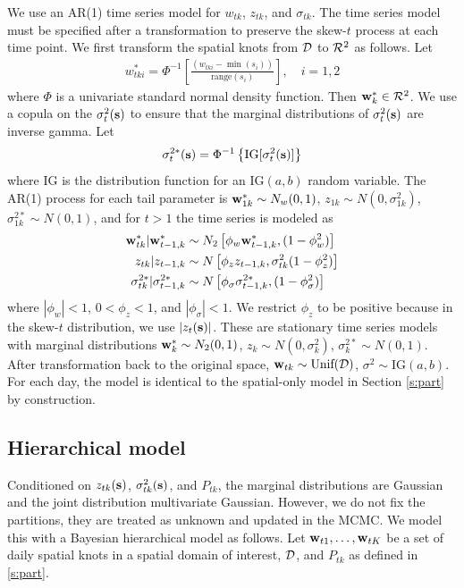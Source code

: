 \documentclass[11pt]{article}
\begin{document}
We use an AR(1) time series model for $w_{tk}$, $z_{tk}$, and $\sigma_{tk}$.
The time series model must be specified after a transformation to preserve the skew-$t$ process at each time point.
We first transform the spatial knots from ${\cal D}$ to ${\cal R}^2$ as follows.
Let
\begin{align}
  w^*_{tki} = \Phi^{-1}\left[ \frac{ (w_{tki} - \min(s_i))}{ \text{range}(s_i) } \right], \quad i = 1, 2
\end{align}
where $\Phi$ is a univariate standard normal density function.
Then $\mbox{\bf w}^*_k \in {\cal R}^2$.
We use a copula on the $\sigma^2_t(\mbox{\bf s})$ to ensure that the marginal distributions of $\sigma^2_t(\mbox{\bf s})$ are inverse gamma.
Let
\begin{align}
  \sigma^{2*}_t(\mbox{\bf s}) =\Phi^{-1}\left\{ \text{IG}[\sigma^2_t(\mbox{\bf s})] \right\}
\end{align}
where IG is the distribution function for an IG$(a, b)$ random variable.
The AR(1) process for each tail parameter is $\mbox{\bf w}^*_{1k} \sim N_w(0, 1)$, $z_{1k} \sim N(0, \sigma^2_{1k})$, $\sigma^{2*}_{1k} \sim N(0, 1)$, and for $t > 1$ the time series is modeled as
\begin{align}
  \mbox{\bf w}^*_{tk} | \mbox{\bf w}^*_{t-1, k} &\sim N_2\left[\phi_w \mbox{\bf w}^*_{t-1, k}, (1 - \phi_w^2) \right] \\
  z_{tk} | z_{t-1, k} &\sim N \left[\phi_z z_{t-1, k}, \sigma^2_{tk} (1 - \phi_z^2)\right] \\
  \sigma^{2*}_{tk} | \sigma^{2*}_{t-1, k} &\sim N \left[\phi_\sigma \sigma^{2*}_{t-1, k}, (1 - \phi_\sigma^2) \right]
\end{align}
where $|\phi_w| < 1$, $0 < \phi_z < 1$, and $|\phi_\sigma| < 1$.
We restrict $\phi_z$ to be positive because in the skew-$t$ distribution, we use $|z_t(\mbox{\bf s})|$.
These are stationary time series models with marginal distributions $\mbox{\bf w}^*_{k} \sim N_2(0, 1)$, $z_{k} \sim N(0, \sigma^2_{k})$, $\sigma^{2*}_{k} \sim N(0, 1)$.
After transformation back to the original space, $\mbox{\bf w}_{tk} \sim \text{Unif}({\cal D})$, $\sigma^2 \sim \text{IG}(a, b)$.
For each day, the model is identical to the spatial-only model in Section \ref{s:part} by construction.

\subsection{Hierarchical model}\label{s:hier}
Conditioned on $z_{tk}(\mbox{\bf s})$, $\sigma^2_{tk}(\mbox{\bf s})$, and $P_{tk}$, the marginal distributions are Gaussian and the joint distribution multivariate Gaussian.
However, we do not fix the partitions, they are treated as unknown and updated in the MCMC.
We model this with a Bayesian hierarchical model as follows.
Let $\mbox{\bf w}_{t1}, \ldots, \mbox{\bf w}_{tK}$ be a set of daily spatial knots in a spatial domain of interest, ${\cal D}$, and $P_{tk}$ as defined in \ref{s:part}.
\end{document}
